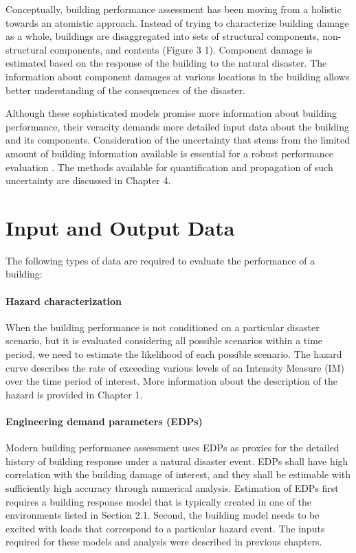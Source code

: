 Conceptually, building performance assessment has been moving from a holistic towards an atomistic approach. Instead of trying to characterize building damage as a whole, buildings are disaggregated into sets of structural components, non-structural components, and contents (Figure 3 1). Component damage is estimated based on the response of the building to the natural disaster. The information about component damages at various locations in the building allows better understanding of the consequences of the disaster. 

Although these sophisticated models promise more information about building performance, their veracity demands more detailed input data about the building and its components. Consideration of the uncertainty that stems from the limited amount of building information available is essential for a robust performance evaluation \citep{bradley2013critical}. The methods available for quantification and propagation of such uncertainty are discussed in Chapter 4.
 
\section{Input and Output Data}
\label{sec:perf_bldg_io}

The following types of data are required to evaluate the performance of a building:

\paragraph{Hazard characterization} When the building performance is not conditioned on a particular disaster scenario, but it is evaluated considering all possible scenarios within a time period, we need to estimate the likelihood of each possible scenario. The hazard curve describes the rate of exceeding various levels of an Intensity Measure (IM) over the time period of interest. More information about the description of the hazard is provided in Chapter 1.
\newline

\paragraph{Engineering demand parameters (EDPs)} Modern building performance assessment uses EDPs as proxies for the detailed history of building response under a natural disaster event. EDPs shall have high correlation with the building damage of interest, and they shall be estimable with sufficiently high accuracy through numerical analysis. Estimation of EDPs first requires a building response model that is typically created in one of the environments listed in Section 2.1. Second, the building model needs to be excited with loads that correspond to a particular hazard event. The inputs required for these models and analysis were described in previous chapters.

